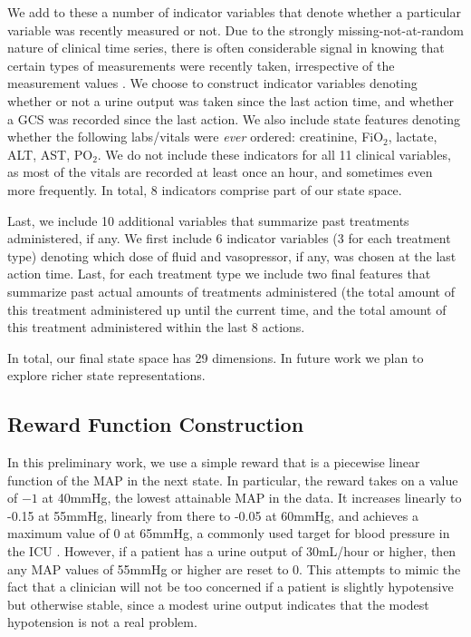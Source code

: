 \documentclass{article}
\begin{document}
We add to these a number of indicator variables that denote whether a particular variable was recently measured or not. Due to the strongly missing-not-at-random nature of clinical time series, there is often considerable signal in knowing that certain types of measurements were recently taken, irrespective of the measurement values \citep{agniel2018biases}. We choose to construct indicator variables denoting whether or not a urine output was taken since the last action time, and whether a GCS was recorded since the last action. We also include state features denoting whether the following labs/vitals were \textit{ever} ordered: creatinine, FiO$_2$, lactate, ALT, AST, PO$_2$. We do not include these indicators for all 11 clinical variables, as most of the vitals are recorded at least once an hour, and sometimes even more frequently. In total, 8 indicators comprise part of our state space.

Last, we include 10 additional variables that summarize past treatments administered, if any. We first include 6 indicator variables (3 for each treatment type) denoting which dose of fluid and vasopressor, if any, was chosen at the last action time. Last, for each treatment type we include two final features that summarize past actual amounts of treatments administered (the total amount of this treatment administered up until the current time, and the total amount of this treatment administered within the last 8 actions.

In total, our final state space has 29 dimensions. In future work we plan to explore richer state representations.

\subsection{Reward Function Construction}

In this preliminary work, we use a simple reward that is a piecewise linear function of the MAP in the next state. In particular, the reward takes on a value of $-1$ at 40mmHg, the lowest attainable MAP in the data. It increases linearly to -0.15 at 55mmHg, linearly from there to -0.05 at 60mmHg, and achieves a maximum value of 0 at 65mmHg, a commonly used target for blood pressure in the ICU \citep{asfar2014high}. However, if a patient has a urine output of 30mL/hour or higher, then any MAP values of 55mmHg or higher are reset to 0. This attempts to mimic the fact that a clinician will not be too concerned if a patient is slightly hypotensive but otherwise stable, since a modest urine output indicates that the modest hypotension is not a real problem.
\end{document}

